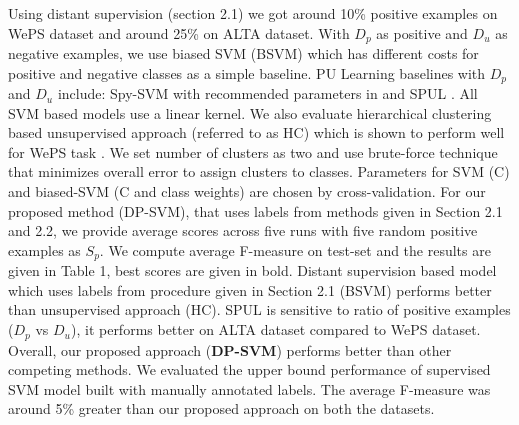 \documentclass{sig-alternate-05-2015}
\begin{document}
Using distant supervision (section 2.1) we got around 10\% positive examples on WePS dataset and around 25\% on ALTA dataset. With $D_{p}$ as positive and $D_{u}$ as negative examples, we use biased SVM (BSVM) which has different costs for positive and negative classes as a simple baseline. PU Learning baselines with $D_{p}$ and $D_{u}$ include: Spy-SVM with recommended parameters in\cite{liu2002partially} and SPUL \cite{Elkan:2008:LCO:1401890.1401920}. All SVM based models use a linear kernel. We also evaluate hierarchical clustering based unsupervised approach (referred to as HC) which is shown to perform well for WePS task \cite{delgado2014data}. We set number of clusters as two and use brute-force technique that minimizes overall error to assign clusters to classes.
Parameters for SVM (C) and biased-SVM (C and class weights) are chosen by cross-validation. For our proposed method (DP-SVM), that uses labels from methods given in Section 2.1 and 2.2, we provide average scores across five runs with five random positive examples as $S_{p}$. We compute average F-measure on test-set and the results are given in Table 1, best scores are given in bold. Distant supervision based model which uses labels from procedure given in Section 2.1 (BSVM) performs better than unsupervised approach (HC). SPUL is sensitive to ratio of positive examples ($D_{p}$ vs $D_{u}$), it performs better on ALTA dataset compared to WePS dataset. Overall, our proposed approach (\textbf{DP-SVM}) performs better than other competing methods. We evaluated the upper bound performance of supervised SVM model built with manually annotated labels. The average F-measure was around 5\% greater than our proposed approach on both the datasets.

\end{document}
